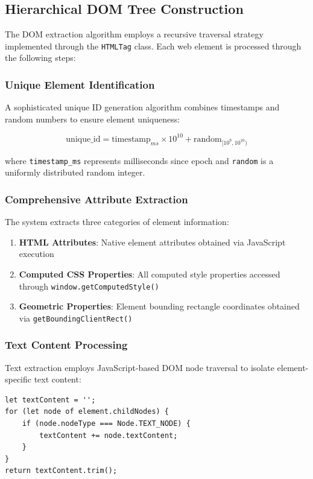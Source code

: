 \subsection{Hierarchical DOM Tree Construction}
\label{subsec:dom-construction}

The DOM extraction algorithm employs a recursive traversal strategy implemented through the \texttt{HTMLTag} class. Each web element is processed through the following steps:

\subsubsection{Unique Element Identification}
A sophisticated unique ID generation algorithm combines timestamps and random numbers to ensure element uniqueness:

\begin{equation}
\text{unique\_id} = \text{timestamp}_{ms} \times 10^{10} + \text{random}_{[10^9, 10^{10})}
\end{equation}

where \texttt{timestamp\_ms} represents milliseconds since epoch and \texttt{random} is a uniformly distributed random integer.

\subsubsection{Comprehensive Attribute Extraction}
The system extracts three categories of element information:

\begin{enumerate}
    \item \textbf{HTML Attributes}: Native element attributes obtained via JavaScript execution
    \item \textbf{Computed CSS Properties}: All computed style properties accessed through \texttt{window.getComputedStyle()}
    \item \textbf{Geometric Properties}: Element bounding rectangle coordinates obtained via \texttt{getBoundingClientRect()}
\end{enumerate}

\subsubsection{Text Content Processing}
Text extraction employs JavaScript-based DOM node traversal to isolate element-specific text content:

\begin{lstlisting}[caption=Text Content Extraction Algorithm]
let textContent = '';
for (let node of element.childNodes) {
    if (node.nodeType === Node.TEXT_NODE) {
        textContent += node.textContent;
    }
}
return textContent.trim();
\end{lstlisting}

